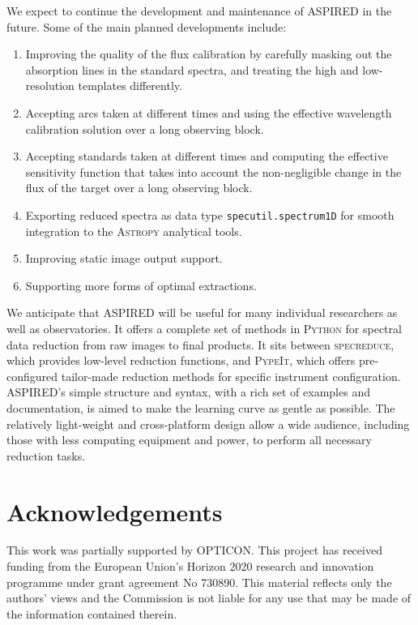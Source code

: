 \documentclass[linenumbers, twocolumn]{aastex631}
\begin{document}
We expect to continue the development and maintenance of \textsc{ASPIRED} in the
future. Some of the main planned developments include:
\begin{enumerate}
    \item Improving the quality of the flux calibration by
    carefully masking out the absorption lines in the standard spectra, and
    treating the high and low-resolution templates differently.
    \item Accepting arcs taken at different times and using the effective wavelength
    calibration solution over a long observing block.
    \item Accepting standards taken at different times and computing the effective
    sensitivity function that takes into account the non-negligible change
    in the flux of the target over a long observing block.
    \item Exporting reduced spectra as data type \texttt{specutil.spectrum1D}
    for smooth integration to the \textsc{Astropy} analytical tools.
    \item Improving static image output support.
    \item Supporting more forms of optimal extractions.
\end{enumerate}

We anticipate that ASPIRED will be useful for many individual researchers as
well as observatories. It offers a complete set of methods in \textsc{Python}
for spectral data reduction from raw images to final products. It sits between
\textsc{specreduce}, which provides low-level reduction functions, and 
\textsc{PypeIt}, which offers pre-configured tailor-made reduction methods for
specific instrument configuration. \textsc{ASPIRED}'s simple structure and
syntax, with a rich set of examples and documentation, is aimed to make the
learning curve as gentle as possible. The relatively light-weight and
cross-platform design allow a wide audience, including those with less
computing equipment and power, to perform all necessary reduction tasks.


\section*{Acknowledgements}
This work was partially supported by OPTICON. This project has
received funding from the European Union's Horizon 2020 research and
innovation programme under grant agreement No 730890. This material
reflects only the authors' views and the Commission is not liable for
any use that may be made of the information contained therein.
\end{document}
